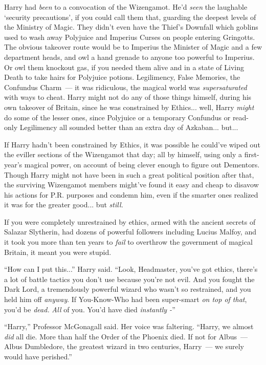 Harry had \emph{been} to a convocation of the Wizengamot. He'd \emph{seen} the laughable `security precautions', if you could call them that, guarding the deepest levels of the Ministry of Magic. They didn't even have the Thief's Downfall which goblins used to wash away Polyjuice and Imperius Curses on people entering Gringotts. The obvious takeover route would be to Imperius the Minister of Magic and a few department heads, and owl a hand grenade to anyone too powerful to Imperius. Or owl them knockout gas, if you needed them alive and in a state of Living Death to take hairs for Polyjuice potions. Legilimency, False Memories, the Confundus Charm~--- it was ridiculous, the magical world was \emph{supersaturated} with ways to cheat. Harry might not do any of those things himself, during his own takeover of Britain, since he was constrained by Ethics... well, Harry \emph{might} do some of the lesser ones, since Polyjuice or a temporary Confundus or read-only Legilimency all sounded better than an extra day of Azkaban... but...

If Harry hadn't been constrained by Ethics, it was possible he could've wiped out the eviller sections of the Wizengamot that day; all by himself, using only a first-year's magical power, on account of being clever enough to figure out Dementors. Though Harry might not have been in such a great political position after that, the surviving Wizengamot members might've found it easy and cheap to disavow his actions for P.R. purposes and condemn him, even if the smarter ones realized it was for the greater good... but \emph{still.}

If you were completely unrestrained by ethics, armed with the ancient secrets of Salazar Slytherin, had dozens of powerful followers including Lucius Malfoy, and it took you more than ten years to \emph{fail} to overthrow the government of magical Britain, it meant you were stupid.

``How can I put this...'' Harry said. ``Look, Headmaster, you've got ethics, there's a lot of battle tactics you don't use because you're not evil. And you fought the Dark Lord, a tremendously powerful wizard who wasn't so restrained, and you held him off \emph{anyway}. If You-Know-Who had been super-smart \emph{on top of that}, you'd be \emph{dead.} \emph{All} of you. You'd have died \emph{instantly -}''

``Harry,'' Professor McGonagall said. Her voice was faltering. ``Harry, we almost \emph{did} all die. More than half the Order of the Phoenix died. If not for Albus~--- Albus Dumbledore, the greatest wizard in two centuries, Harry~--- we surely would have perished.''

